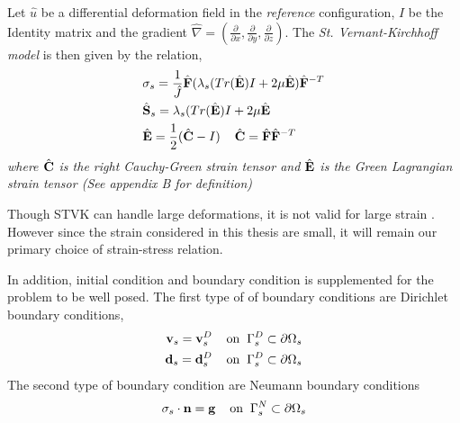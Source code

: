  \begin{defn}
Let $\hat{u}$ be a differential deformation field in the \textit{reference} configuration, $I$ be the Identity matrix and the gradient $\hat{\nabla} = (\frac{\partial}{\partial x}, \frac{\partial}{\partial y}, \frac{\partial}{\partial z}) $. The \textit{St. Vernant-Kirchhoff model} is then given by the relation,
\begin{align*}
&\sigma_s = \frac{1}{\hat{J}} \hat{\mathbf{F}}(\lambda_s(Tr(\hat{\mathbf{E}}) I + 2 \mu \hat{\mathbf{E}})\hat{\mathbf{F}}^{-T} \\
&\hat{\mathbf{S}}_s = \lambda_s(Tr(\hat{\mathbf{E}}) I + 2 \mu \hat{\mathbf{E}} \\
&\hat{\mathbf{E}} = \frac{1}{2}(\hat{\mathbf{C}} - I ) \hspace{4mm} \hat{\mathbf{C}} = \hat{\mathbf{F}}\hat{\mathbf{F}}^{-T}
\end{align*} 
\textit{where $\hat{\mathbf{C}}$ is the right Cauchy-Green strain tensor and $\hat{\mathbf{E}}$ is the Green Lagrangian strain tensor
(See appendix B for definition)}
\end{defn}
  

Though STVK can handle large deformations, it is not valid for large strain \cite{Razzaq2010}. However since the strain considered in this thesis are small, it will remain our primary choice of strain-stress relation.

In addition, initial condition and boundary condition is supplemented for the problem to be well posed. The first type of of boundary conditions are Dirichlet boundary conditions, 
\begin{align}
\mathbf{v}_s = \mathbf{v}_s^D 
\hspace{4mm} \text{on} \hspace{2mm} \Gamma_s^D \subset \partial \Omega_s  \\
\mathbf{d}_s = \mathbf{d}_s^D 
\hspace{4mm} \text{on} \hspace{2mm} \Gamma_s^D \subset \partial \Omega_s  \\
\end{align}
The second type of boundary condition are Neumann boundary conditions
\begin{align}
\sigma_s \cdot \mathbf{n} = \mathbf{g}  
\hspace{4mm} \text{on} \hspace{2mm} \Gamma_s^N \subset \partial \Omega_s 
\end{align}
 \newpage
